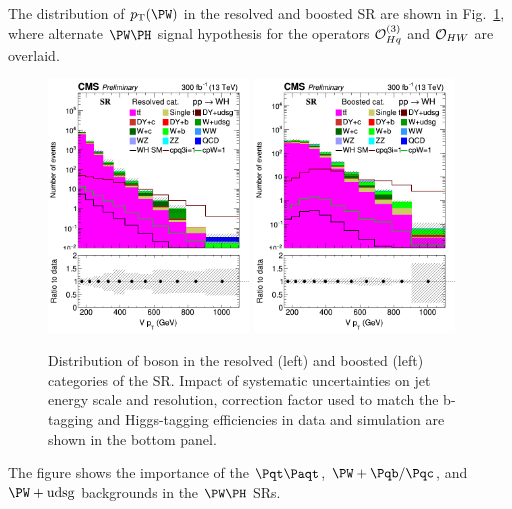 \documentclass[a4paper,11pt]{article}
\newcommand{\Pb}{{{\Pqb}}\xspace}
\newcommand{\Pt}{{{\Pqt}}\xspace}
\newcommand{\Pc}{{{\Pqc}}\xspace}
\newcommand{\PAt}{{{{\Paqt}}}\xspace}
\begin{document}
The distribution of $\pt(\PW)$ in the resolved and boosted SR are shown in Fig.~\ref{fig:RECO_Vpt_WH}, where alternate $\PW\PH$ signal hypothesis for the operators ${\cal O}^{(3)}_{Hq}$ and ${\cal O}_{HW}$  are overlaid. 
\begin{figure}[hbtp]
\begin{center}
\includegraphics[width=0.475\textwidth]{Figures/RECO/Plot_Resolved_SR_V_pt.png}
\includegraphics[width=0.475\textwidth]{Figures/RECO/Plot_Boosted_SR_V_pt.png}
\end{center}
\caption{
Distribution of \PW boson \pt in the resolved (left) and boosted (left) categories of the SR. Impact of systematic uncertainties on jet energy scale and resolution, correction factor used to match the b-tagging and Higgs-tagging efficiencies in data and simulation are shown in the bottom panel.
}
\label{fig:RECO_Vpt_WH}
\end{figure}
The figure shows the importance of the $\Pt\PAt$, ${\PW}+\Pb/\Pc$, and ${\PW}+\textrm{udsg}$ backgrounds in the  $\PW\PH$ SRs.
\end{document}
